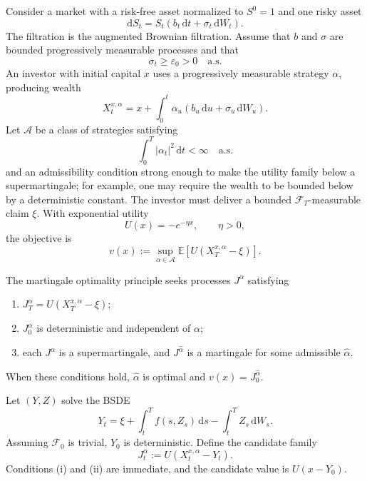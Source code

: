 Consider a market with a risk-free asset normalized to \(S^0=1\) and one risky asset
\[
\mathrm dS_t=S_t(b_t\,\mathrm dt+\sigma_t\,\mathrm dW_t).
\]
The filtration is the augmented Brownian filtration. Assume that \(b\) and \(\sigma\) are bounded progressively measurable processes and that
\[
\sigma_t\ge\varepsilon_0>0
\quad\text{a.s.}
\]
An investor with initial capital \(x\) uses a progressively measurable strategy \(\alpha\), producing wealth
\[
X_t^{x,\alpha}
=x+\int_0^t\alpha_u
(b_u\,\mathrm du+\sigma_u\,\mathrm dW_u).
\]
Let \(\mathcal A\) be a class of strategies satisfying
\[
\int_0^T|\alpha_t|^2\,\mathrm dt<\infty
\quad\text{a.s.}
\]
and an admissibility condition strong enough to make the utility family below a supermartingale; for example, one may require the wealth to be bounded below by a deterministic constant. The investor must deliver a bounded \(\mathcal F_T\)-measurable claim \(\xi\). With exponential utility
\[
U(x)=-e^{-\eta x},
\qquad \eta>0,
\]
the objective is
\[
v(x)
:=\sup_{\alpha\in\mathcal A}
\mathbb E[U(X_T^{x,\alpha}-\xi)].
\]

The martingale optimality principle seeks processes \(J^\alpha\) satisfying
\begin{enumerate}[label=\textup{(\roman*)}]
\item \(J_T^\alpha=U(X_T^{x,\alpha}-\xi)\);
\item \(J_0^\alpha\) is deterministic and independent of \(\alpha\);
\item each \(J^\alpha\) is a supermartingale, and \(J^{\hat\alpha}\) is a martingale for some admissible \(\hat\alpha\).
\end{enumerate}
When these conditions hold, \(\hat\alpha\) is optimal and \(v(x)=J_0^{\hat\alpha}\).

Let \((Y,Z)\) solve the BSDE
\[
Y_t
=\xi+\int_t^T f(s,Z_s)\,\mathrm ds
-\int_t^T Z_s\,\mathrm dW_s.
\]
Assuming \(\mathcal F_0\) is trivial, \(Y_0\) is deterministic. Define the candidate family
\[
J_t^\alpha
:=U(X_t^{x,\alpha}-Y_t).
\]
Conditions (i) and (ii) are immediate, and the candidate value is \(U(x-Y_0)\).

